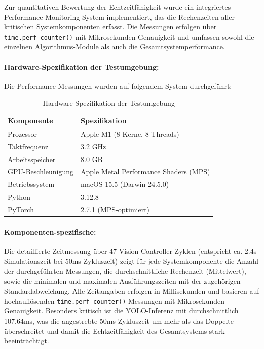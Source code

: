 Zur quantitativen Bewertung der Echtzeitfähigkeit wurde ein integriertes Performance-Monitoring-System implementiert, das die Rechenzeiten aller kritischen Systemkomponenten erfasst. Die Messungen erfolgen über \texttt{time.perf\_counter()} mit Mikrosekunden-Genauigkeit und umfassen sowohl die einzelnen Algorithmus-Module als auch die Gesamtsystemperformance.


\paragraph{Hardware-Spezifikation der Testumgebung:}

Die Performance-Messungen wurden auf folgendem System durchgeführt:

\begin{table}[htbp]
\centering
\caption{Hardware-Spezifikation der Testumgebung}
\label{tab:hardware-specs}
\begin{tabular}{ll}
\toprule
\textbf{Komponente} & \textbf{Spezifikation} \\
\midrule
Prozessor & Apple M1 (8 Kerne, 8 Threads) \\
Taktfrequenz & 3.2 GHz \\
Arbeitsspeicher & 8.0 GB \\
GPU-Beschleunigung & Apple Metal Performance Shaders (MPS) \\
Betriebssystem & macOS 15.5 (Darwin 24.5.0) \\
Python & 3.12.8 \\
PyTorch & 2.7.1 (MPS-optimiert) \\
\bottomrule
\end{tabular}
\end{table}

\paragraph{Komponenten-spezifische:}

Die detaillierte Zeitmessung über 47 Vision-Controller-Zyklen (entspricht ca. 2.4s Simulationszeit bei 50ms Zykluszeit) zeigt für jede Systemkomponente die Anzahl der durchgeführten Messungen, die durchschnittliche Rechenzeit (Mittelwert), sowie die minimalen und maximalen Ausführungszeiten mit der zugehörigen Standardabweichung. Alle Zeitangaben erfolgen in Millisekunden und basieren auf hochauflösenden \texttt{time.perf\_counter()}-Messungen mit Mikrosekunden-Genauigkeit. Besonders kritisch ist die YOLO-Inferenz mit durchschnittlich 107.64ms, was die angestrebte 50ms Zykluszeit um mehr als das Doppelte überschreitet und damit die Echtzeitfähigkeit des Gesamtsystems stark beeinträchtigt.

